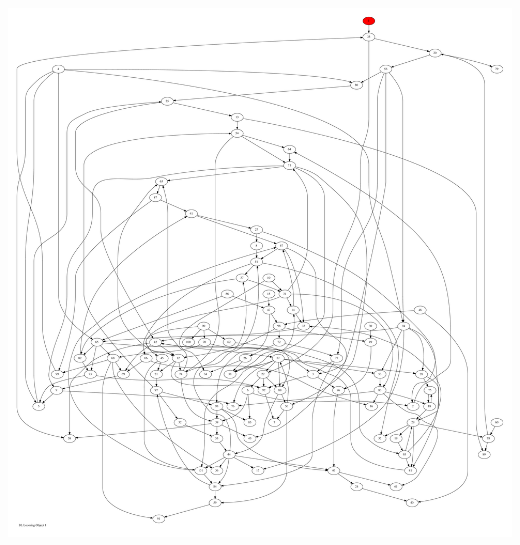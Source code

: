 \documentclass{article}
\begin{document}

\newpage
\includegraphics[max height=\textheight,max width=\textwidth]{bl_looming_objs/bl_loom_obj1_pp.pdf}
\end{document}

